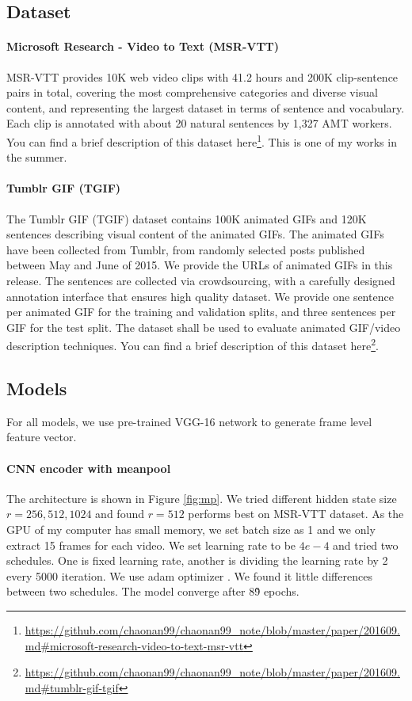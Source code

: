 \subsection{Dataset}
\paragraph{Microsoft Research - Video to Text (MSR-VTT)}
MSR-VTT provides 10K web video clips with 41.2 hours and 200K clip-sentence pairs in total, covering the most comprehensive categories and diverse visual content, and representing the largest dataset in terms of sentence and vocabulary. Each clip is annotated with about 20 natural sentences by 1,327 AMT workers. You can find a brief description of this dataset here\footnote{\url{https://github.com/chaonan99/chaonan99\_note/blob/master/paper/201609.md\#microsoft-research-video-to-text-msr-vtt}}. This is one of my works in the summer.

\paragraph{Tumblr GIF (TGIF)}
The Tumblr GIF (TGIF) dataset contains 100K animated GIFs and 120K sentences describing visual content of the animated GIFs. The animated GIFs have been collected from Tumblr, from randomly selected posts published between May and June of 2015. We provide the URLs of animated GIFs in this release. The sentences are collected via crowdsourcing, with a carefully designed annotation interface that ensures high quality dataset. We provide one sentence per animated GIF for the training and validation splits, and three sentences per GIF for the test split. The dataset shall be used to evaluate animated GIF/video description techniques. You can find a brief description of this dataset here\footnote{\url{https://github.com/chaonan99/chaonan99\_note/blob/master/paper/201609.md\#tumblr-gif-tgif}}.

\subsection{Models}
For all models, we use pre-trained VGG-16 \cite{simonyan2014very} network to generate frame level feature vector.
\paragraph{CNN encoder with meanpool}
The architecture is shown in Figure \ref{fig:mp}. We tried different hidden state size $r=256,512,1024$ and found $r=512$ performs best on MSR-VTT dataset. As the GPU of my computer has small memory, we set batch size as 1 and we only extract 15 frames for each video. We set learning rate to be $4e-4$ and tried two schedules. One is fixed learning rate, another is dividing the learning rate by 2 every 5000 iteration. We use adam optimizer \cite{Kingma2014Adam}. We found it little differences between two schedules. The model converge after 8\~9 epochs.

